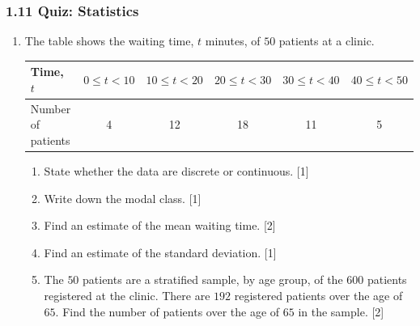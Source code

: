 \documentclass[12pt, twoside]{article}
\begin{document}
\subsubsection*{1.11 Quiz: Statistics}

\begin{enumerate}[itemsep=0.15cm]

\item[1.] [Maximum mark: 7]

The table shows the waiting time, $t$ minutes, of $50$ patients at a
clinic.

\begin{center}
\setlength{\tabcolsep}{3.5pt}\renewcommand{\arraystretch}{1.2}
\begin{tabular}{|l|c|c|c|c|c|}
\hline
Time, $t$ & $0 \le t < 10$ & $10 \le t < 20$ & $20 \le t < 30$ & $30 \le t < 40$ & $40 \le t < 50$ \\
\hline
Number of patients & 4 & 12 & 18 & 11 & 5 \\
\hline
\end{tabular}
\end{center}

\begin{enumerate}[itemsep=0.1cm]
  \item State whether the data are discrete or continuous. \hfill [1]
  \item Write down the modal class. \hfill [1]
  \item Find an estimate of the mean waiting time. \hfill [2]
  \item Find an estimate of the standard deviation. \hfill [1]
  \item The $50$ patients are a stratified sample, by age group, of the
  $600$ patients registered at the clinic. There are $192$ registered
  patients over the age of $65$. Find the number of patients over the age
  of $65$ in the sample. \hfill [2]
\end{enumerate}


\newpage


\end{enumerate}
\end{document}
